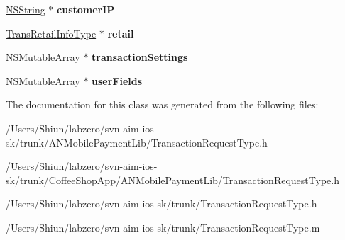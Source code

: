 \begin{DoxyCompactItemize}
\item 
\hypertarget{interface_transaction_request_type_a683bf2a7e9b898db0cd5d7013efc12ac}{
\hyperlink{class_n_s_string}{NSString} $\ast$ {\bfseries customerIP}}
\label{interface_transaction_request_type_a683bf2a7e9b898db0cd5d7013efc12ac}

\item 
\hypertarget{interface_transaction_request_type_a5b7501b2034221f04297f3e73442a2c3}{
\hyperlink{interface_trans_retail_info_type}{TransRetailInfoType} $\ast$ {\bfseries retail}}
\label{interface_transaction_request_type_a5b7501b2034221f04297f3e73442a2c3}

\item 
\hypertarget{interface_transaction_request_type_abae009e92263c774d525fd79500c4ce6}{
NSMutableArray $\ast$ {\bfseries transactionSettings}}
\label{interface_transaction_request_type_abae009e92263c774d525fd79500c4ce6}

\item 
\hypertarget{interface_transaction_request_type_a3b3c99a7ee23d1aeeb524f1716f48479}{
NSMutableArray $\ast$ {\bfseries userFields}}
\label{interface_transaction_request_type_a3b3c99a7ee23d1aeeb524f1716f48479}

\end{DoxyCompactItemize}


The documentation for this class was generated from the following files:\begin{DoxyCompactItemize}
\item 
/Users/Shiun/labzero/svn-\/aim-\/ios-\/sk/trunk/ANMobilePaymentLib/TransactionRequestType.h\item 
/Users/Shiun/labzero/svn-\/aim-\/ios-\/sk/trunk/CoffeeShopApp/ANMobilePaymentLib/TransactionRequestType.h\item 
/Users/Shiun/labzero/svn-\/aim-\/ios-\/sk/trunk/TransactionRequestType.h\item 
/Users/Shiun/labzero/svn-\/aim-\/ios-\/sk/trunk/TransactionRequestType.m\end{DoxyCompactItemize}
